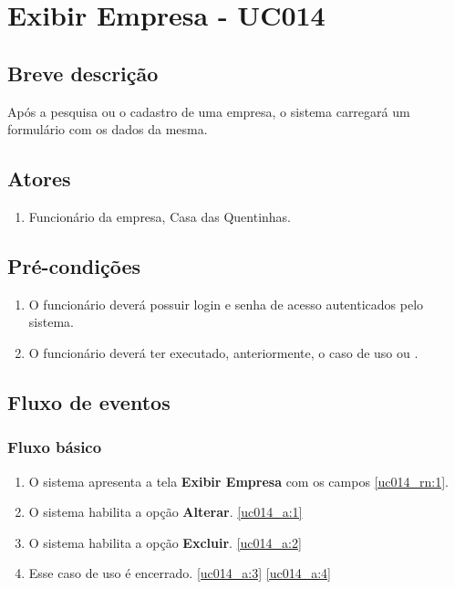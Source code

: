 \chapter{Exibir Empresa - UC014} \label{uc014}

\section{Breve descrição}

Após a pesquisa ou o cadastro de uma empresa, o sistema carregará um formulário com os dados da mesma.

\section{Atores}

\begin{enumerate}
	\item Funcionário da empresa, Casa das Quentinhas.
\end{enumerate}

\section{Pré-condições}

\begin{enumerate}
	\item O funcionário deverá possuir login e senha de acesso autenticados pelo sistema.
	\item O funcionário deverá ter executado, anteriormente, o caso de uso  ou .
\end{enumerate}

\section{Fluxo de eventos}

\subsection{Fluxo básico}

\begin{enumerate}[label=P\arabic*]
	\item O sistema apresenta a tela \textbf{Exibir Empresa} com os campos \ref{uc014_rn:1}. \label{uc014_p:1}
	\item O sistema habilita a opção \textbf{Alterar}. \label{uc014_p:2}\ref{uc014_a:1} 
	\item O sistema habilita a opção \textbf{Excluir}. \label{uc014_p:3}\ref{uc014_a:2}
	\item Esse caso de uso é encerrado. \label{uc014_p:4}\ref{uc014_a:3} \ref{uc014_a:4}
\end{enumerate}

